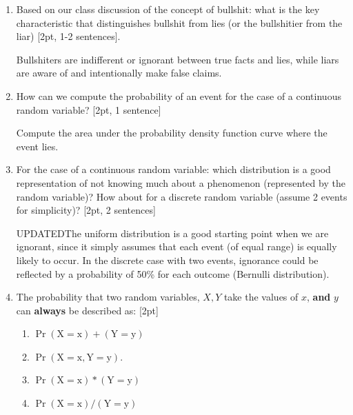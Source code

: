 \documentclass[answers]{exam}
\begin{document}
\begin{enumerate}

	\item  Based on our class discussion of the concept of bullshit: what is the key characteristic that distinguishes bullshit from lies (or the bullshitier from the liar) [2pt, 1-2 sentences].   
	
	\begin{solution}
	Bullshiters are indifferent or ignorant between true facts and lies, while liars are aware of and intentionally make false claims.
	\end{solution}
	







	\item How can we compute the probability of an event for the case of a continuous random variable? [2pt, 1 sentence] 
	\begin{solution}
	Compute the area under the probability density function curve where the event lies.
	\end{solution}
	

	\item For the case of a continuous random variable: which distribution is a good representation of not knowing much about a phenomenon (represented by the random variable)? How about for a discrete random variable (assume 2 events for simplicity)?
	[2pt, 2 sentences]
	\begin{solution}
	UPDATEDThe uniform distribution is a good starting point when we are ignorant, since it simply assumes that each event (of equal range) is equally likely to occur.  In the discrete case with two events, ignorance could be reflected by a probability of 50\% for each outcome (Bernulli distribution).
	\end{solution}


\item 
    The probability that two random variables, $X, Y$ take the values of $x$, \textbf{and} $y$ can \textbf{always} be described as: [2pt]
    \begin{enumerate}[label=\alph*)]
    \item  $\operatorname{Pr}(\mathrm{X}=\mathrm{x})+(\mathrm{Y}=\mathrm{y})$
    \item $\operatorname{Pr}(\mathrm{X}=\mathrm{x}, \mathrm{Y}=\mathrm{y})$.
    \item $\operatorname{Pr}(\mathrm{X}=\mathrm{x}) *(\mathrm{Y}=\mathrm{y})$
    \item $\operatorname{Pr}(\mathrm{X}=\mathrm{x}) /(\mathrm{Y}=\mathrm{y})$
    \end{enumerate}


\end{enumerate}
\end{document}
